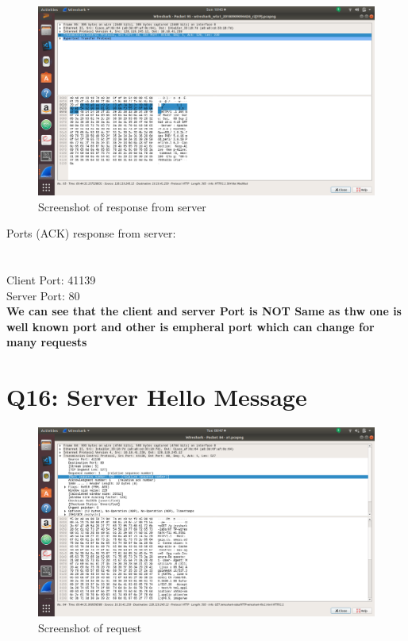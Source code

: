 \documentclass{article}
\begin{document}
  \begin{figure}[H]
 \centering
 \includegraphics[width=1.0\textwidth]{../q15/b.png}
 \caption{\label{fig:PING}Screenshot of response from server}
 \end{figure}
 
  Ports (ACK) response from server:\\ \\
 \\
 Client Port: 41139 \\
 Server Port: 80 \\
 
 \textbf{We can see that the client and server Port is \textbf{NOT} Same as thw one is well known port and other is empheral port which can change for many requests}
 
\section{Q16: Server Hello Message}
  \begin{figure}[H]
 \centering
 \includegraphics[width=1.0\textwidth]{../q16/a.png}
 \caption{\label{fig:PING}Screenshot of request}
 \end{figure}
 
\end{document}
